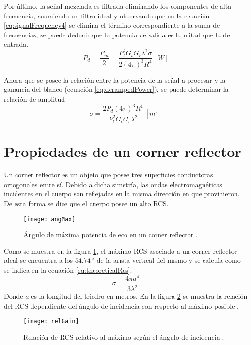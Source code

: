 Por último, la señal mezclada es filtrada eliminando los componentes de alta frecuencia, asumiendo un filtro ideal y observando que en la ecuación \ref{eq:signalFrequency4} se elimina el término correspondiente a la suma de frecuencias, se puede deducir que la potencia de salida es la mitad que la de entrada.
\begin{equation} \label{eq:derampedPower}
  P_d = \dfrac{P_m}{2} = \dfrac{P_t^2G_tG_r\lambda^2\sigma}{2(4\pi)^3 R^4} \,[\si{W}]
\end{equation}

Ahora que se posee la relación entre la potencia de la señal a procesar y la ganancia del blanco (ecuación \ref{eq:derampedPower}), se puede determinar la relación de amplitud
\begin{equation}
  \sigma = \dfrac{2P_d(4\pi)^3 R^4}{P_t^2G_tG_r\lambda^2} \,[\si{m^2}]
\end{equation}


\section{Propiedades de un corner reflector}

Un corner reflector es un objeto que posee tres superficies conductoras ortogonales entre sí. Debido a dicha simetría, las ondas electromagnéticas incidentes en el cuerpo son reflejadas en la misma dirección en que provinieron. De esta forma se dice que el cuerpo posee un alto RCS.

\begin{figure}[H]
 \centering
 \texttt{[image: angMax]}
 \caption{Ángulo de máxima potencia de eco en un corner reflector \cite{Michelson1993}.}
 \label{fig:cornerMax}
\end{figure}

Como se muestra en la figura \ref{fig:cornerMax}, el máximo RCS asociado a un corner reflector ideal se encuentra a los $\SI{54.74}{\degree}$ de la arista vertical del mismo y se calcula como se indica en la ecuación \ref{eq:theoreticalRcs}.
\begin{equation} \label{eq:theoreticalRcs}
  \sigma = \dfrac{4\pi a^4}{3\lambda^2}
\end{equation}
Donde $a$ es la longitud del triedro en metros. En la figura \ref{fig:cornerRel} se muestra la relación del RCS dependiente del ángulo de incidencia con respecto al máximo posible \cite{Michelson1993}.

\begin{figure}[H]
 \centering
 \texttt{[image: relGain]}
 \caption{Relación de RCS relativo al máximo según el ángulo de incidencia \cite{Michelson1993}.}
 \label{fig:cornerRel}
\end{figure}

